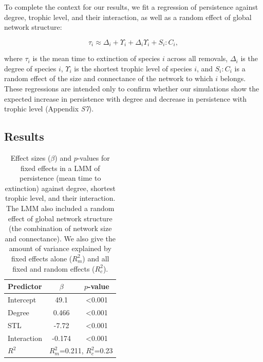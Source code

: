 \documentclass[12pt]{article}
\begin{document}
\begin{spacing}{2.0}
            To complete the context for our results, we fit a regression of persistence against degree, trophic level, and their interaction, as well as a random effect of global network structure:
            
            \begin{equation}
                \tau_{i} \approx \Delta_{i} + \Upsilon_{i} + \Delta_{i}\Upsilon_{i} + S_{i}:C_{i} ,
                \label{eq:persistence_degTL}
            \end{equation}
            
            where $\tau_{i}$ is the mean time to extinction of species $i$ across all removals, $\Delta_i$ is the degree of species $i$, $\Upsilon_i$ is the shortest trophic level of species $i$, and $S_{i}:C_{i}$ is a random effect of the size and connectance of the network to which $i$ belongs.
            These regressions are intended only to confirm whether our simulations show the expected increase in persistence with degree and decrease in persistence with trophic level (Appendix \emph{S7}).

	\subsection*{Results}


		\begin{table}[h!]
		\caption{Effect sizes ($\beta$) and $p$-values for fixed effects in a LMM of persistence (mean time to extinction) against degree, shortest trophic level, and their interaction. The LMM also included a random effect of global network structure (the combination of network size and connectance). We also give the amount of variance explained by fixed effects alone ($R^2_m$) and all fixed and random effects ($R^2_c$).}
		\label{tab:per_degTL}
		\begin{tabular}{l | c c |}
		Predictor & $\beta$ & $p$-value \\
		\hline
		Intercept & 49.1 & \textless0.001 \\
		Degree & 0.466 & \textless0.001 \\
		STL & -7.72 & \textless0.001 \\
		Interaction & -0.174 & \textless0.001 \\
		\hline
		$R^2$ & \multicolumn{2}{|c}{$R^2_m$=0.211, $R^2_c$=0.23} \\
		\end{tabular}
		\end{table}

\clearpage



\end{spacing}
\end{document}
